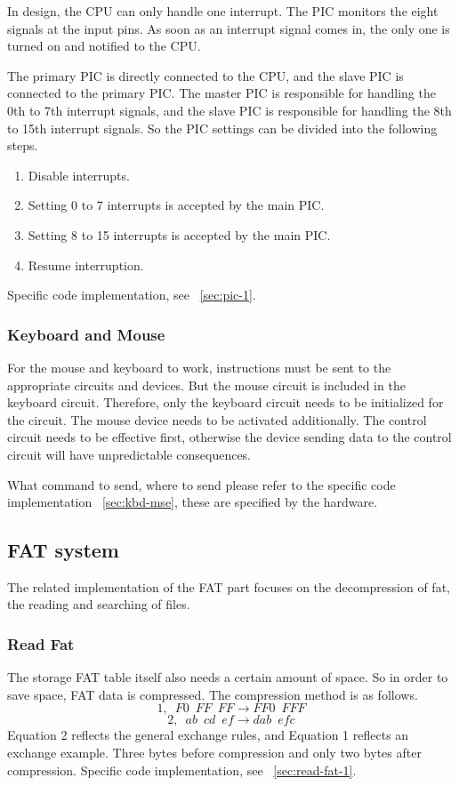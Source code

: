 \documentclass{swfcthesis}
\begin{document}
In design, the CPU can only handle one interrupt. The PIC monitors the eight signals at
the input pins. As soon as an interrupt signal comes in, the only one is turned on and
notified to the CPU.

The primary PIC is directly connected to the CPU, and the slave PIC is connected to the
primary PIC. The master PIC is responsible for handling the 0th to 7th interrupt signals,
and the slave PIC is responsible for handling the 8th to 15th interrupt signals. So the
PIC settings can be divided into the following steps.

\begin{enumerate}
\item Disable interrupts.
\item Setting 0 to 7 interrupts is accepted by the main PIC.
\item Setting 8 to 15 interrupts is accepted by the main PIC.
\item Resume interruption.
\end{enumerate}
Specific code implementation, see ~\ref{sec:pic-1}.

\subsubsection{Keyboard and Mouse}
\label{sec:keyboard-mouse}

For the mouse and keyboard to work, instructions must be sent to the appropriate circuits
and devices. But the mouse circuit is included in the keyboard circuit. Therefore, only
the keyboard circuit needs to be initialized for the circuit. The mouse device needs to be
activated additionally. The control circuit needs to be effective first, otherwise the
device sending data to the control circuit will have unpredictable consequences.

What command to send, where to send please refer to the specific code implementation
~\ref{sec:kbd-mse}, these are specified by the hardware.

\subsection{FAT system}
\label{sec:fat-system}

The related implementation of the FAT part focuses on the decompression of fat, the
reading and searching of files.

\subsubsection{Read Fat}
\label{sec:read-fat}
The storage FAT table itself also needs a certain amount of space. So in order to save
space, FAT data is compressed. The compression method is as follows.
$$1, \enspace F0 \enspace FF \enspace FF \rightarrow FF0 \enspace FFF$$
$$2, \enspace ab \enspace cd \enspace ef \rightarrow dab \enspace efc$$
Equation 2 reflects the general exchange rules, and Equation 1 reflects an exchange
example. Three bytes before compression and only two bytes after compression. Specific
code implementation, see ~\ref{sec:read-fat-1}.
\end{document}
